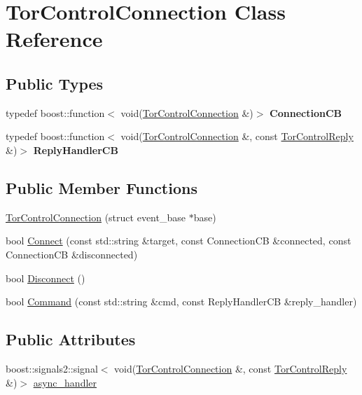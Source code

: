 \hypertarget{class_tor_control_connection}{}\section{Tor\+Control\+Connection Class Reference}
\label{class_tor_control_connection}
\subsection*{Public Types}
\begin{DoxyCompactItemize}
\item 
\mbox{\label{class_tor_control_connection_a30ec1d9f7e35720dc435e555e212ad73}} 
typedef boost\+::function$<$ void(\mbox{\hyperlink{class_tor_control_connection}{Tor\+Control\+Connection}} \&)$>$ {\bfseries Connection\+CB}
\item 
\mbox{\label{class_tor_control_connection_a67d9147b8c27456cc7fe15e4d6d8e844}} 
typedef boost\+::function$<$ void(\mbox{\hyperlink{class_tor_control_connection}{Tor\+Control\+Connection}} \&, const \mbox{\hyperlink{class_tor_control_reply}{Tor\+Control\+Reply}} \&)$>$ {\bfseries Reply\+Handler\+CB}
\end{DoxyCompactItemize}
\subsection*{Public Member Functions}
\begin{DoxyCompactItemize}
\item 
\mbox{\hyperlink{class_tor_control_connection_a5850ebb205bddf1fbc97271fae8eaf78}{Tor\+Control\+Connection}} (struct event\+\_\+base $\ast$base)
\item 
bool \mbox{\hyperlink{class_tor_control_connection_a36b6359caf9a304efe310b9b7141a939}{Connect}} (const std\+::string \&target, const Connection\+CB \&connected, const Connection\+CB \&disconnected)
\item 
bool \mbox{\hyperlink{class_tor_control_connection_addb42114063641eab12be2fc39b859d5}{Disconnect}} ()
\item 
bool \mbox{\hyperlink{class_tor_control_connection_a5d0292a1389bb0f78d15fe6c06a2baeb}{Command}} (const std\+::string \&cmd, const Reply\+Handler\+CB \&reply\+\_\+handler)
\end{DoxyCompactItemize}
\subsection*{Public Attributes}
\begin{DoxyCompactItemize}
\item 
boost\+::signals2\+::signal$<$ void(\mbox{\hyperlink{class_tor_control_connection}{Tor\+Control\+Connection}} \&, const \mbox{\hyperlink{class_tor_control_reply}{Tor\+Control\+Reply}} \&)$>$ \mbox{\hyperlink{class_tor_control_connection_a23c206776020bd925c2da41e840cc08a}{async\+\_\+handler}}
\end{DoxyCompactItemize}



